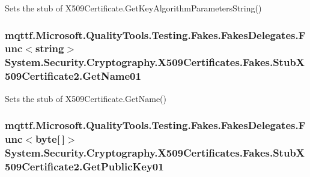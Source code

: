 Sets the stub of X509\-Certificate.\-Get\-Key\-Algorithm\-Parameters\-String()

\hypertarget{class_system_1_1_security_1_1_cryptography_1_1_x509_certificates_1_1_fakes_1_1_stub_x509_certificate2_a9ec482b9d1ee34f949ee2a5f8021c346}{
\subsubsection[{Get\-Name01}]{\setlength{\rightskip}{0pt plus 5cm}mqttf.\-Microsoft.\-Quality\-Tools.\-Testing.\-Fakes.\-Fakes\-Delegates.\-Func$<$string$>$ System.\-Security.\-Cryptography.\-X509\-Certificates.\-Fakes.\-Stub\-X509\-Certificate2.\-Get\-Name01}}\label{class_system_1_1_security_1_1_cryptography_1_1_x509_certificates_1_1_fakes_1_1_stub_x509_certificate2_a9ec482b9d1ee34f949ee2a5f8021c346}


Sets the stub of X509\-Certificate.\-Get\-Name()

\hypertarget{class_system_1_1_security_1_1_cryptography_1_1_x509_certificates_1_1_fakes_1_1_stub_x509_certificate2_ae65d34b11b41aec7125d4ef6f1343051}{
\subsubsection[{Get\-Public\-Key01}]{\setlength{\rightskip}{0pt plus 5cm}mqttf.\-Microsoft.\-Quality\-Tools.\-Testing.\-Fakes.\-Fakes\-Delegates.\-Func$<$byte\mbox{[}$\,$\mbox{]}$>$ System.\-Security.\-Cryptography.\-X509\-Certificates.\-Fakes.\-Stub\-X509\-Certificate2.\-Get\-Public\-Key01}}\label{class_system_1_1_security_1_1_cryptography_1_1_x509_certificates_1_1_fakes_1_1_stub_x509_certificate2_ae65d34b11b41aec7125d4ef6f1343051}


